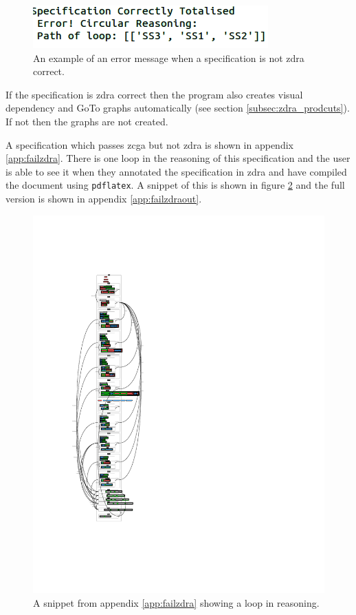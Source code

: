 \begin{figure}[H]
\centering
\includegraphics[scale=0.5]{Figures/zdra/loopmessage.png}
\caption{An example of an error message when a specification is not \gls{zdra} correct. \label{fig:zdraerrormess}}
\end{figure}

If the specification is \gls{zdra} correct then the program also creates visual
dependency and GoTo graphs automatically (see section
\ref{subsec:zdra_prodcuts}). If not then the graphs are not created.

A specification which passes \gls{zcga} but not \gls{zdra} is shown in appendix
\ref{app:failzdra}. There is one loop in the reasoning of this specification and
the user is able to see it when they annotated the specification in \gls{zdra}
and have compiled the document using \texttt{pdflatex}. A snippet of this is
shown in figure \ref{fig:zdraloopsnippet} and the full version is shown in
appendix \ref{app:failzdraout}.

\begin{figure}[H]
\includegraphics[clip, trim=0cm 10cm 6cm 11cm, scale=1.3]{examples/nonworkzdra/1n2.pdf}
\caption{A snippet from appendix \ref{app:failzdra} showing a loop in reasoning. \label{fig:zdraloopsnippet}}
\end{figure}

